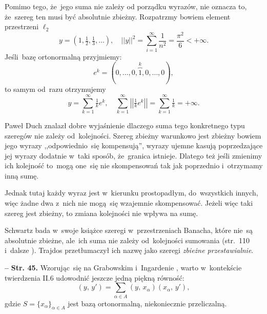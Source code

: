 \documentclass[a4paper,11pt]{article}
\newcommand{\spaceFour}{0.5em}
\newcommand{\ld}{\ldots}
\newcommand{\tb}{\textbf}
\newcommand{\noi}{\noindent}
\newcommand{\ld}{\ldots}
\newcommand{\tb}{\textbf}
\newcommand{\noi}{\noindent}
\newcommand{\start}{\noi \tb{--} {}}
\newcommand{\Str}[1]{\tb{Str. #1.}}
\newcommand{\fr}{\frac}
\newcommand{\tfr}{\tfrac}
\newcommand{\norm}[1]{\left|\left| #1 \right|\right|}
\newcommand{\al}{\alpha}
\newcommand{\Sum}{\sum\limits}
\newcommand{\lcd}{\ell_{ 2 }}  %
\newcommand{\SP}[2]{( #1, \, #2 )}  %
\begin{document}
Pomimo tego, że~jego suma nie zależy od porządku wyrazów, nie oznacza
to, że~szereg ten musi być absolutnie zbieżny. Rozpatrzmy bowiem
element przestrzeni $\lcd$
\begin{equation*}
  y = ( 1, \tfr{ 1 }{ 2 }, \tfr{ 1 }{ 3 },\ld ), \quad
  \norm{ y }^{ 2 } = \Sum_{ i = 1 }^{ \infty } \fr{ 1 }{ n^{ 2 } }
  = \fr{ \pi^{ 2 } }{ 6 } < +\infty.
\end{equation*}
Jeśli~bazę ortonormalną przyjmiemy:
\begin{equation*}
  e^{ k } = ( 0, \ld, 0, \overbrace{ 1 }^{ k }, 0, \ld, 0),
\end{equation*}
to samym od~razu otrzymujemy
\begin{equation*}
  y = \Sum_{ k = 1 }^{ \infty } \tfr{ 1 }{ k } e^{ k }, \quad
  \Sum_{ k = 1 }^{ \infty } \norm{ \tfr{ 1 }{ k } e^{ k } }
  = \Sum_{ k = 1 }^{ \infty } \tfr{ 1 }{ k } = +\infty.
\end{equation*}

Paweł Duch znalazł dobre wyjaśnienie dlaczego suma tego konkretnego
typu szeregów nie zależy od~kolejności. Szereg zbieżny warunkowo jest
zbieżny bowiem jego wyrazy ,,odpowiednio~się kompensują'', wyrazy
ujemne kasują poprzedzające jej wyrazy dodatnie w~taki sposób,
że~granica istnieje. Dlatego też jeśli zmienimy ich kolejność to~mogą
one~się nie skompensowań tak jak poprzednio i~otrzymamy inną sumę.

Jednak tutaj każdy wyraz jest w~kierunku prostopadłym, do~wszystkich
innych, więc żadne dwa z~nich nie mogą~się wzajemnie skompensować.
Jeżeli więc taki szereg jest zbieżny, to zmiana kolejności nie wpływa
na sumę.

Schwartz bada w~swoje książce szeregi w~przestrzeniach Banacha, które
nie~są absolutnie zbieżne, ale~ich suma nie zależy od~kolejności
sumowania (str.~110 i~dalsze \cite{Schwartz79}). Trajdos przetłumaczył
ich nazwę jako szeregi \emph{zbieżne przestawialnie}. %

\vspace{\spaceFour}


\start \Str{45} Wzorując~się na Grabowskim i~Ingardenie
\cite{GrabowskiIngardenMechanikaKwantowa87}, warto w~kontekście
twierdzenia II.6 udowodnić jeszcze jedną piękną równość:
\begin{equation*}
  \SP{ y }{ y' } = \Sum_{ \al \in A } \SP{ y }{ x_{ \al } }
  \SP{ x_{ \al } }{ y' },
\end{equation*}
gdzie $S = \{ x_{ \al } \}_{ \al \in A }$ jest bazą ortonormalną,
niekoniecznie przeliczalną.
\end{document}
